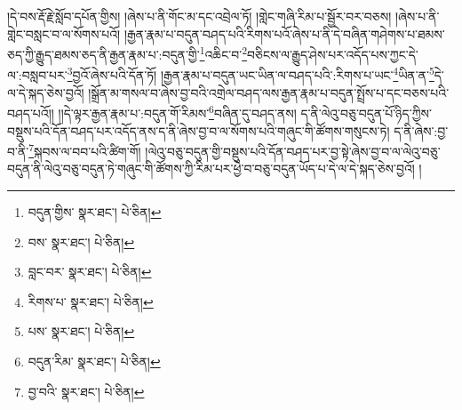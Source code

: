 །དེ་བས་རྡོ་རྗེ་སློབ་དཔོན་གྱིས། །ཞེས་པ་ནི་གོང་མ་དང་འབྲེལ་ཏོ། །གླེང་གཞི་རིམ་པ་སྦྱོར་བར་བཅས། །ཞེས་པ་ནི་གླེང་བསླང་བ་ལ་སོགས་པའོ། །རྒྱན་རྣམ་པ་བདུན་བཤད་པའི་རིགས་པའོ་ཞེས་པ་ནི་དེ་བཞིན་གཤེགས་པ་ཐམས་ཅད་ཀྱི་རྒྱུད་ཐམས་ཅད་ནི་རྒྱན་རྣམ་པ་:བདུན་གྱི་\footnote{བདུན་གྱིས་  སྣར་ཐང་།  པེ་ཅིན། }འཆིང་བ་\footnote{བས་  སྣར་ཐང་།  པེ་ཅིན། }བཅིངས་ལ་རྒྱུད་ཤེས་པར་འདོད་པས་ཀྱང་དེ་ལ་:བསླབ་པར་\footnote{བླང་བར་  སྣར་ཐང་།  པེ་ཅིན། }བྱའོ་ཞེས་པའི་དོན་ཏོ། །རྒྱན་རྣམ་པ་བདུན་ཡང་ཡིན་ལ་བཤད་པའི་:རིགས་པ་ཡང་\footnote{རིགས་པ་  སྣར་ཐང་།  པེ་ཅིན། }ཡིན་ན་\footnote{པས་  སྣར་ཐང་།  པེ་ཅིན། }དེ་ལ་དེ་སྐད་ཅེས་བྱའོ། །སྒྲོན་མ་གསལ་བ་ཞེས་བྱ་བའི་འགྲེལ་བཤད་ལས་རྒྱན་རྣམ་པ་བདུན་སྤྲོས་པ་དང་བཅས་པའི་བཤད་པའོ།། །།དེ་ལྟར་རྒྱན་རྣམ་པ་:བདུན་གོ་རིམས་\footnote{བདུན་རིམ་  སྣར་ཐང་།  པེ་ཅིན། }བཞིན་དུ་བཤད་ནས། ད་ནི་ལེའུ་བཅུ་བདུན་པོ་ཉིད་ཀྱིས་བསྡུས་པའི་དོན་བཤད་པར་འདོད་ནས་ད་ནི་ཞེས་བྱ་བ་ལ་སོགས་པའི་གཞུང་གི་ཚོགས་གསུངས་ཏེ། ད་ནི་ཞེས་:བྱ་བ་ནི་\footnote{བྱ་བའི་  སྣར་ཐང་།  པེ་ཅིན། }སྐབས་ལ་བབ་པའི་ཚིག་གོ། །ལེའུ་བཅུ་བདུན་གྱི་བསྡུས་པའི་དོན་བཤད་པར་བྱ་སྟེ་ཞེས་བྱ་བ་ལ་ལེའུ་བཅུ་བདུན་ནི་ལེའུ་བཅུ་བདུན་ཏེ་གཞུང་གི་ཚོགས་ཀྱི་རིམ་པར་ཕྱེ་བ་བཅུ་བདུན་ཡོད་པ་དེ་ལ་དེ་སྐད་ཅེས་བྱའོ། །
